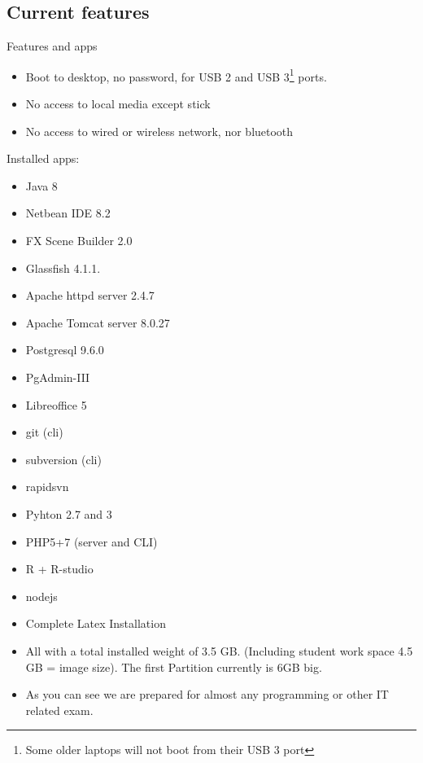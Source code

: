 \subsection{Current features}
\begin{frame}[shrink]{Features and apps}
\begin{itemize}
\item Boot to desktop, no password, for USB 2 and USB 3\footnote{Some
    older laptops will not boot from their USB 3 port} ports.
\item No access to local media except stick
\item No access to wired or wireless network, nor bluetooth
\end{itemize}
Installed apps:{\scriptsize
\begin{multicols}{2}
  \begin{itemize}
  \item Java 8
  \item Netbean IDE 8.2
  \item FX Scene Builder 2.0
  \item Glassfish 4.1.1.
  \item Apache httpd server 2.4.7
  \item Apache Tomcat server 8.0.27
  \item Postgresql 9.6.0
  \item PgAdmin-III
  \item Libreoffice 5
  \item git (cli)
  \item subversion (cli)
  \item rapidsvn 
  \item Pyhton 2.7 and 3
  \item PHP5+7 (server and CLI)
  \item R + R-studio
  \item nodejs
  \item Complete Latex Installation
  \end{itemize}
\end{multicols}}
\begin{itemize}
\item All with a total installed weight of 3.5 GB. (Including student
  work space 4.5 GB = image size). The first Partition currently is
  6GB big.
\item As you can see we are prepared for almost any programming or
  other IT related exam.
\end{itemize}
\end{frame}

